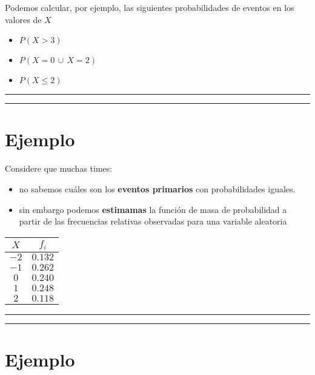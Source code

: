 \documentclass[
]{book}
\providecommand{\tightlist}{%
  \setlength{\itemsep}{0pt}\setlength{\parskip}{0pt}}
\begin{document}
Podemos calcular, por ejemplo, las siguientes probabilidades de eventos en los valores de \(X\)

\begin{itemize}
\tightlist
\item
  \(P(X>3)\)
\item
  \(P(X=0\, \cup\, X=2 )\)
\item
  \(P(X \leq 2)\)
\end{itemize}

\begin{center}\rule{0.5\linewidth}{0.5pt}\end{center}

\begin{center}\rule{0.5\linewidth}{0.5pt}\end{center}

\hypertarget{ejemplo-6}{%
\section{Ejemplo}\label{ejemplo-6}}

Considere que muchas times:

\begin{itemize}
\tightlist
\item
  no sabemos cuáles son los \textbf{eventos primarios} con probabilidades iguales.
\item
  sin embargo podemos \textbf{estimamas} la función de masa de probabilidad a partir de las frecuencias relativas observadas para una variable aleatoria
\end{itemize}

\begin{longtable}[]{@{}cc@{}}
\toprule
\(X\) & \(f_i\) \\
\midrule
\endhead
\(-2\) & \(0.132\) \\
\(-1\) & \(0.262\) \\
\(0\) & \(0.240\) \\
\(1\) & \(0.248\) \\
\(2\) & \(0.118\) \\
\bottomrule
\end{longtable}

\begin{center}\rule{0.5\linewidth}{0.5pt}\end{center}

\begin{center}\rule{0.5\linewidth}{0.5pt}\end{center}

\hypertarget{ejemplo-7}{%
\section{Ejemplo}\label{ejemplo-7}}
\end{document}
